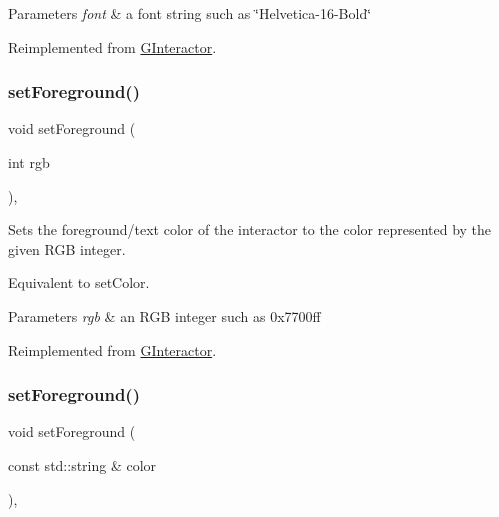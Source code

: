 \begin{DoxyParams}{Parameters}
{\em font} & a font string such as \char`\"{}\+Helvetica-\/16-\/\+Bold\char`\"{} \\
\hline
\end{DoxyParams}


Reimplemented from \mbox{\hyperlink{classsgl_1_1GInteractor_a8e096e8818d838aceae1d46d58fb3a7b}{G\+Interactor}}.

\mbox{\label{classsgl_1_1GLabel_a59f7cd2bd1708c12dfa52a8f7c7b79c9}} 
\subsubsection{\texorpdfstring{set\+Foreground()}{setForeground()}\hspace{0.1cm}{\footnotesize\ttfamily [1/2]}}
{\footnotesize\ttfamily void set\+Foreground (\begin{DoxyParamCaption}\item[{int}]{rgb }\end{DoxyParamCaption})\hspace{0.3cm}{\ttfamily [override]}, {\ttfamily [virtual]}}



Sets the foreground/text color of the interactor to the color represented by the given R\+GB integer. 

Equivalent to set\+Color. 
\begin{DoxyParams}{Parameters}
{\em rgb} & an R\+GB integer such as 0x7700ff \\
\hline
\end{DoxyParams}


Reimplemented from \mbox{\hyperlink{classsgl_1_1GInteractor_a9eb856b5ff83a19df3831a31f15f4563}{G\+Interactor}}.

\mbox{\label{classsgl_1_1GLabel_a8afbcf1f47750fb4c717f9ff36540235}} 
\subsubsection{\texorpdfstring{set\+Foreground()}{setForeground()}\hspace{0.1cm}{\footnotesize\ttfamily [2/2]}}
{\footnotesize\ttfamily void set\+Foreground (\begin{DoxyParamCaption}\item[{const std\+::string \&}]{color }\end{DoxyParamCaption})\hspace{0.3cm}{\ttfamily [override]}, {\ttfamily [virtual]}}



